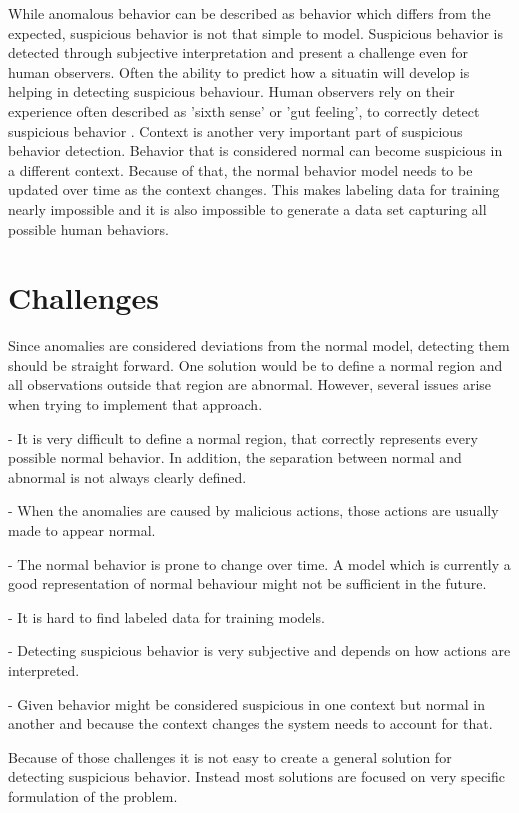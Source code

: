 While anomalous behavior can be described as behavior which differs from the expected, suspicious behavior is not that simple to model. Suspicious behavior is detected through subjective interpretation and present a challenge even for human observers. Often the ability to predict how a situatin will develop is helping in detecting suspicious behaviour. Human observers rely on their experience often described as 'sixth sense' or 'gut feeling', to correctly detect suspicious behavior \cite{n18}. Context is another very important part of suspicious behavior detection. Behavior that is considered normal can become suspicious in a different context. Because of that, the normal behavior model needs to be updated over time as the context changes. This makes labeling data for training nearly impossible and it is also impossible to generate a data set capturing all possible human behaviors.


\section{Challenges}

Since anomalies are considered deviations from the normal model, detecting them should be straight forward. One solution would be to define a normal region and all observations outside that region are abnormal. However, several issues arise when trying to implement that approach.

- It is very difficult to define a normal region, that correctly represents every possible normal behavior. In addition, the separation between normal and abnormal is not always clearly defined.

- When the anomalies are caused by malicious actions, those actions are usually made to appear normal.

- The normal behavior is prone to change over time. A model which is currently a good representation of normal behaviour might not be sufficient in the future.

- It is hard to find labeled data for training models.

- Detecting suspicious behavior is very subjective and depends on how actions are interpreted.

- Given behavior might be considered suspicious in one context but normal in another and because the context changes the system needs to account for that.

Because of those challenges it is not easy to create a general solution for detecting suspicious behavior. Instead most solutions are focused on very specific formulation of the problem.



